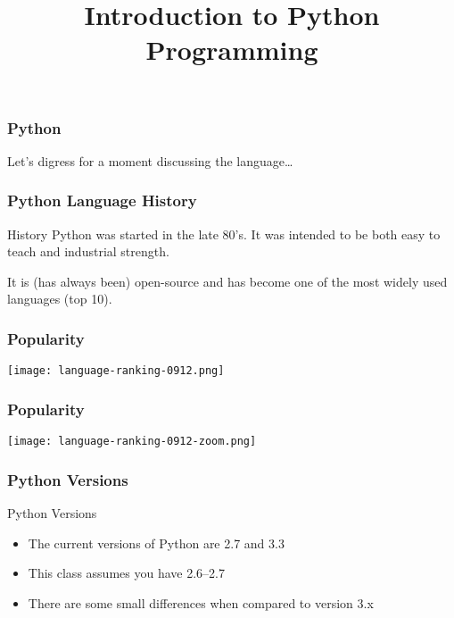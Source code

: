 
\title[Python I]{Introduction to Python Programming}


\frame{\maketitle}


\begin{frame}[fragile]
\frametitle{Python}

Let's digress for a moment discussing the language\ldots
\end{frame}


\begin{frame}[fragile]
\frametitle{Python Language History}

\begin{block}{History}
Python was started in the late 80's. It was intended to be both \alert{easy to teach} and \alert{industrial strength}.

It is (has always been) open-source and has become one of the most widely used languages (top 10).
\end{block}
\end{frame}

\begin{frame}
\frametitle{Popularity}

\centering
\texttt{[image: language-ranking-0912.png]}

\end{frame}

\begin{frame}
\frametitle{Popularity}

\centering
\texttt{[image: language-ranking-0912-zoom.png]}

\end{frame}
\begin{frame}
\frametitle{Python Versions}

\begin{block}{Python Versions}
\begin{itemize}
\item The current versions of Python are \alert{2.7} and \alert{3.3}
\item This class assumes you have 2.6--2.7
\item There are some small differences when compared to version 3.x
\end{itemize}
\end{block}

\end{frame}


